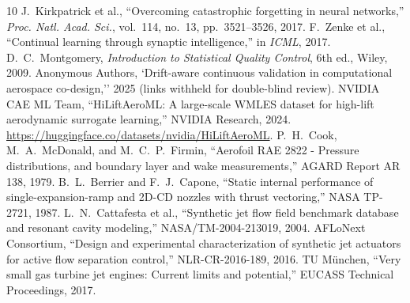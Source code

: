 \documentclass[journal,10pt,twocolumn]{IEEEtran}
\begin{document}
\begin{thebibliography}{10}
 J.~Kirkpatrick et al., ``Overcoming catastrophic forgetting in neural networks,'' \emph{Proc. Natl. Acad. Sci.}, vol.~114, no.~13, pp.~3521--3526, 2017.
 F.~Zenke et al., ``Continual learning through synaptic intelligence,'' in \emph{ICML}, 2017.
 D.~C.~Montgomery, \emph{Introduction to Statistical Quality Control}, 6th ed., Wiley, 2009.
 Anonymous Authors, `Drift-aware continuous validation in computational aerospace co-design,'' 2025 (links withheld for double-blind review).
 NVIDIA CAE ML Team, ``HiLiftAeroML: A large-scale WMLES dataset for high-lift aerodynamic surrogate learning,'' NVIDIA Research, 2024. \url{https://huggingface.co/datasets/nvidia/HiLiftAeroML}.
 P.~H.~Cook, M.~A.~McDonald, and M.~C.~P.~Firmin, ``Aerofoil RAE 2822 - Pressure distributions, and boundary layer and wake measurements,'' AGARD Report AR 138, 1979.
 B.~L.~Berrier and F.~J.~Capone, ``Static internal performance of single-expansion-ramp and 2D-CD nozzles with thrust vectoring,'' NASA TP-2721, 1987.
 L.~N.~Cattafesta et al., ``Synthetic jet flow field benchmark database and resonant cavity modeling,'' NASA/TM-2004-213019, 2004.
 AFLoNext Consortium, ``Design and experimental characterization of synthetic jet actuators for active flow separation control,'' NLR-CR-2016-189, 2016.
 TU M\"unchen, ``Very small gas turbine jet engines: Current limits and potential,'' EUCASS Technical Proceedings, 2017.
\end{thebibliography}
\end{document}
